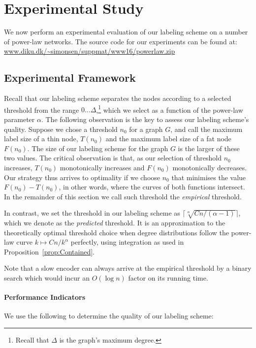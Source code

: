 \section{Experimental Study}

We now  perform an experimental evaluation of our labeling scheme on a number of power-law networks.
The source code for our experiments can be found at:\\ \url{www.diku.dk/~simonsen/suppmat/www16/powerlaw.zip}

\subsection{Experimental Framework}\label{Sec:Experimental}
Recall that our labeling scheme separates  the nodes according to a selected threshold from the range $0 \dots \Delta$,\footnote{Recall that $\Delta$ is the graph's maximum degree.} which we select as a function of  the power-law parameter $\alpha$.
The following observation is the key to assess our labeling scheme's quality.
Suppose we chose a threshold  $n_0$ for a graph $G$, and call  the maximum label size of a thin node, $T(n_0)$ and the maximum label size of a fat node $F(n_0)$.  The size of our labeling scheme for the graph $G$ is the larger of these two values.
The critical observation is that, as our selection of threshold $n_0$ increases, $T(n_0)$ monotonically increases and  $F(n_0)$ monotonically decreases.
Our strategy thus arrives to optimality if we choose $n_0$ that minimises  the value $F(n_0)-T(n_0)$, in other words, where the curves of both functions intersect.
In the remainder of this section we call such threshold the \emph{empirical} threshold.

In contrast, we set the threshold in our labeling scheme as $\lceil \sqrt[\alpha]{C n/(\alpha-1)} \rceil$, which we denote as the \emph{predicted} threshold.
It is an approximation to the theoretically optimal threshold choice when degree distributions follow the power-law curve $k\mapsto Cn/k^\alpha$ perfectly, using integration as used in Proposition~\ref{prop:Contained}.

Note that a slow encoder can always arrive at the empirical threshold by a binary search which would incur an $O(\log n)$ factor on its running time. 
\paragraph{Performance Indicators}
We use the following to determine the quality of our labeling scheme:

